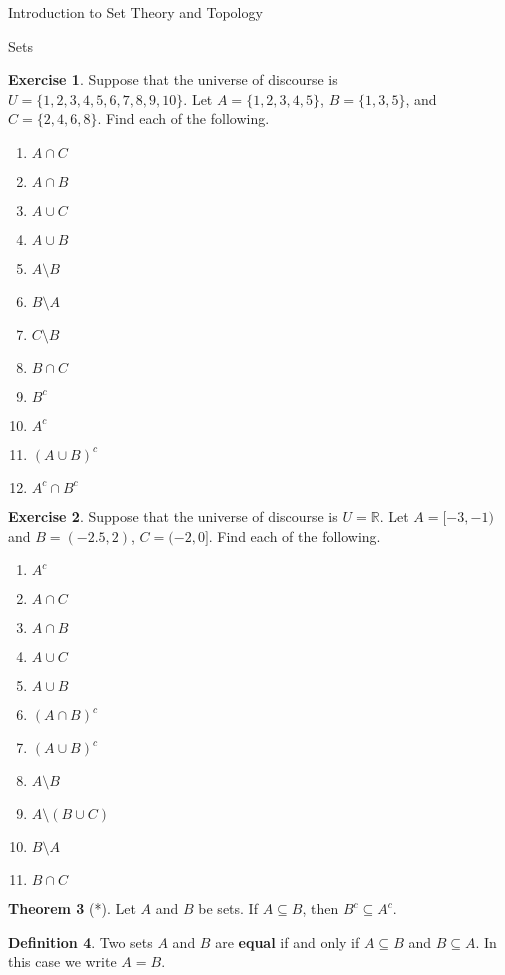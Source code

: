 \documentclass[11pt]{article}
\theoremstyle{definition}
\newtheorem{theorem}{Theorem}[section]
\newtheorem{definition}[theorem]{Definition}
\newtheorem{exercise}[theorem]{Exercise}
\begin{document}
\begin{section}{Introduction to Set Theory and Topology}
\begin{subsection}{Sets}
\begin{exercise}
Suppose that the universe of discourse is $U=\{1,2,3,4,5,6,7,8,9,10\}$.  Let $A=\{1, 2, 3, 4, 5\}$, $B=\{1, 3, 5\}$, and $C=\{2, 4, 6, 8\}$.  Find each of the following.
\begin{enumerate}
  \item $A \cap C$
  \item $A \cap B$
  \item $A \cup C$
  \item $A \cup B$
  \item $A\setminus B$
  \item $B \setminus A$
  \item $C \setminus B$
  \item $B \cap C$
  \item $B^c$
  \item $A^c$
  \item $(A\cup B)^c$
  \item $A^c\cap B^c$
\end{enumerate}
\end{exercise}

\begin{exercise}
Suppose that the universe of discourse is $U=\mathbb{R}$.  Let $A=[-3,-1)$ and $B=(-2.5,2)$, $C=(-2,0]$.  Find each of the following.
\begin{enumerate}
\item $A^c$
  \item $A \cap C$
  \item $A \cap B$
  \item $A \cup C$
  \item $A \cup B$
  \item $(A\cap B)^c$
  \item $(A\cup B)^c$
  \item $A \setminus B$
  \item $A\setminus (B \cup C)$
  \item $B \setminus A$
  \item $B \cap C$
\end{enumerate}
\end{exercise}

\begin{theorem}[*]
Let $A$ and $B$ be sets.  If $A \subseteq B$, then $B^c \subseteq A^c$.
\end{theorem}

\begin{definition}
Two sets $A$ and $B$ are \textbf{equal} if and only if $A \subseteq B$ and $B \subseteq A$.  In this case we write $A = B$.
\end{definition}


\end{subsection}
\end{section}
\end{document}
